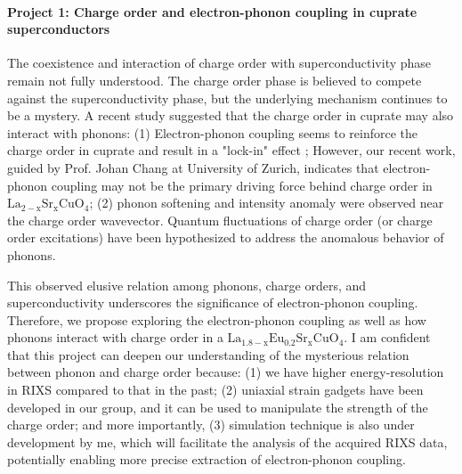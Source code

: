 \documentclass[11pt]{article}
\begin{document}
\paragraph{Project 1: Charge order and electron-phonon coupling in cuprate superconductors}
The coexistence and interaction of charge order with superconductivity phase remain not fully understood. The charge order phase is believed to compete against the superconductivity phase\cite{arpaia_charge_2021,comin_resonant_2016,canosa_resonant_2014, hucker_competing_2014, chang_direct_2012,ghiringhelli_long-range_2012}, but the underlying mechanism continues to be a mystery. A recent study suggested that the charge order in cuprate may also interact with phonons: (1) Electron-phonon coupling seems to reinforce the charge order in cuprate and result in a "lock-in" effect \cite{wang_charge_2021}; However, our recent work, guided by Prof. Johan Chang at University of Zurich, indicates that electron-phonon coupling may not be the primary driving force behind charge order in $\mathrm{La_{2-x}Sr_xCuO_4}$; (2) phonon softening and intensity anomaly were observed near the charge order wavevector\cite{wang_charge_2021,lee_spectroscopic_2021, huang_quantum_2021,lin_strongly_2020,li_multiorbital_2020,braicovich_determining_2020,peng_enhanced_2020, miao_incommensurate_2018,chaix_dispersive_2017,tacon_inelastic_2014}. Quantum fluctuations of charge order (or charge order excitations) have been hypothesized to address the anomalous behavior of phonons\cite{huang_quantum_2021,lee_spectroscopic_2021}.  

This observed elusive relation among phonons, charge orders, and superconductivity underscores the significance of electron-phonon coupling. 
Therefore, we propose exploring the electron-phonon coupling as well as how phonons interact with charge order in a $\mathrm{La_{1.8-x}Eu_{0.2}Sr_xCuO_{4}}$. 
I am confident that this project can deepen our understanding of the mysterious relation between phonon and charge order because: (1) we have higher energy-resolution in RIXS compared to that in the past; (2) uniaxial strain gadgets have been developed in our group, and it can be used to manipulate the strength of the charge order; and more importantly, (3) simulation technique is also under development by me, which will facilitate the analysis of the acquired RIXS data, potentially enabling more precise extraction of electron-phonon coupling.
\end{document}
